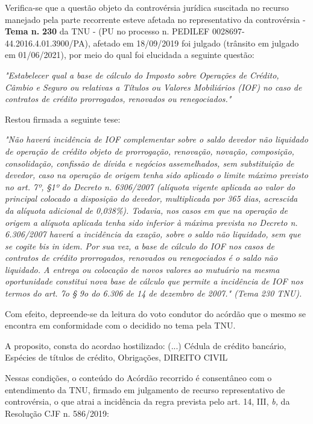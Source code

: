 \documentclass[12pt]{article}
\begin{document}
\justifying
\noindent Verifica-se que a questão objeto da controvérsia jurídica suscitada no recurso manejado pela parte recorrente esteve afetada no representativo da controvérsia - \textbf{Tema n. }\textbf{230} da TNU - (PU no processo n. PEDILEF 0028697-44.2016.4.01.3900/PA),  afetado em 18/09/2019 foi julgado (trânsito em julgado em 01/06/2021), por meio do qual foi elucidada a seguinte questão:

\noindent \textit{"Estabelecer qual a base de cálculo do Imposto sobre Operações de Crédito, Câmbio e Seguro ou relativas a Títulos ou Valores Mobiliários (IOF) no caso de contratos de crédito prorrogados, renovados ou renegociados."}

\noindent Restou firmada a seguinte tese:

\noindent \textit{"Não haverá incidência de IOF complementar sobre o saldo devedor não liquidado de operação de crédito objeto de prorrogação, renovação, novação, composição, consolidação, confissão de dívida e negócios assemelhados, sem substituição de devedor, caso na operação de origem tenha sido aplicado o limite máximo previsto no art. 7º, §1º do Decreto n. 6306/2007 (alíquota vigente aplicada ao valor do principal colocado a disposição do devedor, multiplicada por 365 dias, acrescida da alíquota adicional de 0,038\%). Todavia, nos casos em que na operação de origem a alíquota aplicada tenha sido inferior à máxima prevista no Decreto n. 6.306/2007 haverá a incidência da exação, sobre o saldo não liquidado, sem que se cogite bis in idem. Por sua vez, a base de cálculo do IOF nos casos de contratos de crédito prorrogados, renovados ou renegociados é o saldo não liquidado. A entrega ou colocação de novos valores ao mutuário na mesma oportunidade constitui nova base de cálculo que permite a incidência de IOF nos termos do art. 7o § 9o do 6.306 de 14 de dezembro de 2007." (Tema 230 TNU).}

\noindent Com efeito, depreende-se da leitura do voto condutor do acórdão que o mesmo se encontra em conformidade com o decidido no  tema pela TNU.

\noindent A proposito, consta do acordao hostilizado: (...) Cédula de crédito bancário, Espécies de títulos de crédito, Obrigações, DIREITO CIVIL

\noindent Nessas condições, o conteúdo do Acórdão recorrido é consentâneo com o entendimento da TNU, firmado em julgamento de recurso representativo de controvérsia, o que atrai a incidência da regra prevista pelo art. 14, III, \textit{b,} da Resolução CJF n. 586/2019:
\end{document}
